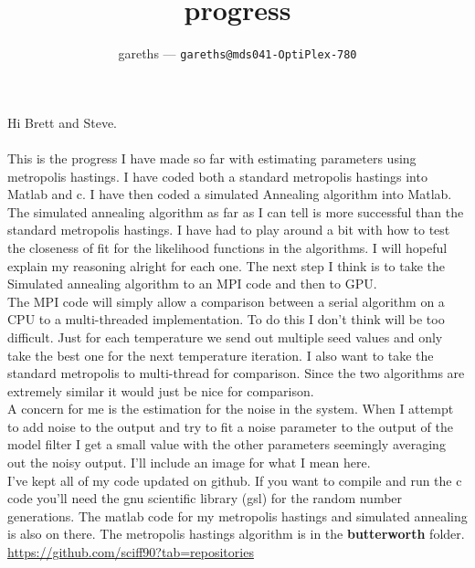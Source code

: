 \documentclass[12pt]{article}
\title{progress
}
\author{gareths --- \texttt{gareths@mds041-OptiPlex-780}}
\begin{document}
\maketitle
\pagebreak
Hi Brett and Steve.\\\\
This is the progress I have made so far with estimating parameters using metropolis hastings. I have coded both a standard metropolis hastings into Matlab and c. I have then coded a simulated Annealing algorithm into Matlab. The simulated annealing algorithm as far as I can tell is more successful than the standard metropolis hastings. I have had to play around a bit with how to test the closeness of fit for the likelihood functions in the algorithms. I will hopeful explain my reasoning alright for each one. The next step I think is to take the Simulated annealing algorithm to an MPI code and then to GPU. \\

The MPI code will simply allow a comparison between a serial algorithm on a CPU to a multi-threaded implementation. To do this I don't think will be too difficult. Just for each temperature we send out multiple seed values and only take the best one for the next temperature iteration. I also want to take the standard metropolis to multi-thread for comparison. Since the two algorithms are extremely similar it would just be nice for comparison.\\

A concern for me is the estimation for the noise in the system. When I attempt to add noise to the output and try to fit a noise parameter to the output of the model filter I get a small value with the other parameters seemingly averaging out the noisy output. I'll include an image for what I mean here.\\

I've kept all of my code updated on github. If you want to compile and run the c code you'll need the gnu scientific library (gsl) for the random number generations. The matlab code for my metropolis hastings and simulated annealing is also on there. The metropolis hastings algorithm is in the \textbf{butterworth} folder. \url{https://github.com/sciff90?tab=repositories}
\end{document}
